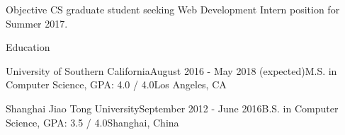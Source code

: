 \documentclass{resume} %
\begin{document}

\begin{rSection}{Objective}
CS graduate student seeking Web Development Intern position for Summer 2017.
\end{rSection}


\begin{rSection}{Education}

\begin{rEducation}{University of Southern California}{August 2016 - May 2018 (expected)}{M.S. in Computer Science, GPA: 4.0 / 4.0}{Los Angeles, CA}
\end{rEducation}

\begin{rEducation}{Shanghai Jiao Tong University}{September 2012 - June 2016}{B.S. in Computer Science, GPA: 3.5 / 4.0}{Shanghai, China}
\end{rEducation}

\end{rSection}

\end{document}
